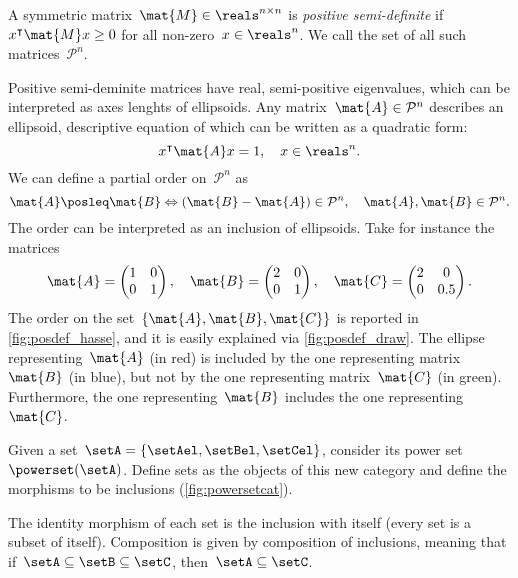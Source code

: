 \begin{example}
    \begin{definition}
        A symmetric matrix~$\mat{M}\in \reals^{n\times n}$ is \emph{positive semi-definite} if~$x^\intercal \mat{M}x\geq 0$ for all non-zero~$x\in \reals^n$.
        We call the set of all such matrices~$\mathcal{P}^n$.
    \end{definition}
    Positive semi-deminite matrices have real, semi-positive eigenvalues, which can be interpreted as axes lenghts of ellipsoids.
    Any matrix~$\mat{A}\in \mathcal{P}^n$ describes an ellipsoid, descriptive equation of which can be written as a quadratic form:
    \begin{equation*}
        x^\intercal \mat{A}x=1,\quad x\in \reals^n.
    \end{equation*}
    We can define a partial order on~$\mathcal{P}^n$ as
    \begin{equation*}
        \mat{A}\posleq \mat{B} \Leftrightarrow (\mat{B}-\mat{A})\in \mathcal{P}^n, \quad \mat{A},\mat{B}\in \mathcal{P}^n.
    \end{equation*}
    The order can be interpreted as an inclusion of ellipsoids.
    Take for instance the matrices
    \begin{equation*}
        \mat{A}=\begin{pmatrix}
            1 & 0 \\0& 1
        \end{pmatrix}, \quad \mat{B}=\begin{pmatrix}
            2 & 0 \\0& 1
        \end{pmatrix},\quad \mat{C}=\begin{pmatrix}
            2 & 0 \\0& 0.5
        \end{pmatrix}.
    \end{equation*}
    The order on the set~$\{\mat{A},\mat{B},\mat{C}\}$ is reported in \cref{fig:posdef_hasse}, and it is easily explained via \cref{fig:posdef_draw}.
    The ellipse representing~$\mat{A}$ (in red) is included by the one representing matrix~$\mat{B}$ (in blue), but not by the one representing matrix~$\mat{C}$ (in green).
    Furthermore, the one representing~$\mat{B}$ includes the one representing~$\mat{C}$.
\end{example}

\begin{example}
    \label{ex:hasseinclusion}
    Given a set~$\setA=\{\setAel,\setBel,\setCel\}$, consider its power set~$\powerset(\setA)$.
    Define sets as the objects of this new category and define the morphisms to be inclusions (\cref{fig:powersetcat}).

    The identity morphism of each set is the inclusion with itself (every set is a subset of itself).
    Composition is given by composition of inclusions, meaning that if~$\setA\subseteq \setB \subseteq \setC$, then~$\setA\subseteq \setC$.
\end{example}

